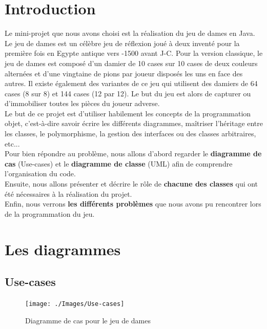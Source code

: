 \documentclass[12,french]{report}
\begin{document}
\tableofcontents


\renewcommand{\chaptername}{}
\chapter*{Introduction}

Le mini-projet que nous avons choisi est la réalisation du jeu de dames en Java.\\

Le jeu de dames est un célèbre jeu de réflexion joué à deux inventé pour la première fois en Egypte antique vers -1500 avant J-C.
Pour la version classique, le jeu de dames est composé d'un damier de 10 cases sur 10 cases de deux couleurs alternées et d'une vingtaine de pions par joueur disposés les uns en face des autres. Il existe également des variantes de ce jeu qui utilisent des damiers de 64 cases (8 sur 8) et 144 cases (12 par 12). 
Le but du jeu est alors de capturer ou d'immobiliser toutes les pièces du joueur adverse. \\

Le but de ce projet est d'utiliser habilement les concepts de la programmation objet, c'est-à-dire savoir écrire les différents diagrammes, maîtriser l'héritage entre les classes, le polymorphisme, la gestion des interfaces ou des classes arbitraires, etc...\\

Pour bien répondre au problème, nous allons d'abord regarder le \textbf{diagramme de cas} (Use-cases) et le \textbf{diagramme de classe} (UML) afin de comprendre l'organisation du code.\\

Ensuite, nous allons présenter et décrire le rôle de \textbf{chacune des classes} qui ont été nécessaires à la réalisation du projet.\\

Enfin, nous verrons \textbf{les différents problèmes} que nous avons pu rencontrer lors de la programmation du jeu.


\chapter{Les diagrammes}

\section{Use-cases}

\begin{figure}[H]
	\center
	\texttt{[image: ./Images/Use-cases]}
	\caption{Diagramme de cas pour le jeu de dames}
\end{figure}\vspace{0.2cm}
\end{document}
